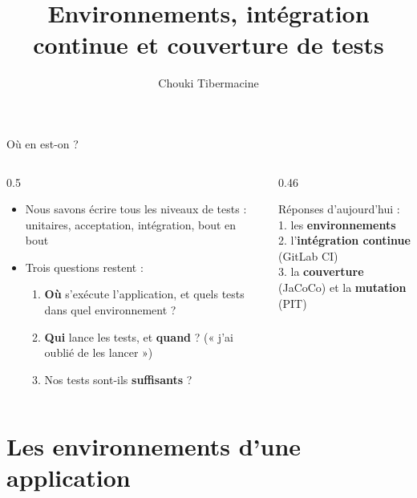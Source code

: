 \documentclass[aspectratio=169,10pt]{beamer}
\title{Environnements, intégration continue et couverture de tests}
\author[C. Tibermacine]{Chouki Tibermacine}
\date{}
\begin{document}

\begin{frame}{Où en est-on ?}
  \begin{columns}[c]
    \begin{column}{0.5\textwidth}
      \begin{itemize}
        \item Nous savons écrire tous les niveaux de tests : unitaires, acceptation, intégration, bout en bout
        \item Trois questions restent :
          \begin{enumerate}
            \item \textbf{Où} s'exécute l'application, et quels tests dans quel environnement ?
            \item \textbf{Qui} lance les tests, et \textbf{quand} ? (« j'ai oublié de les lancer »)
            \item Nos tests sont-ils \textbf{suffisants} ?
          \end{enumerate}
      \end{itemize}
    \end{column}
    \begin{column}{0.46\textwidth}
      \begin{datacard}
        \small
        Réponses d'aujourd'hui :\\[1mm]
        1. les \textbf{environnements}\\
        2. l'\textbf{intégration continue} (GitLab CI)\\
        3. la \textbf{couverture} (JaCoCo) et la \textbf{mutation} (PIT)
      \end{datacard}
    \end{column}
  \end{columns}
\end{frame}

\section{Les environnements d'une application}
\end{document}
